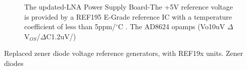 \begin{figure}
 \caption{The updated-LNA Power Supply Board-The +5V reference voltage is provided by a REF195 E-Grade reference IC with a temperature coefficient of less than 5ppm/$^{\circ}$C \cite{ref19x}. The AD8624 opamps (Vo\approximately10uV $\Delta$V$_{OS}$/$\Delta$C\approximately1.2uV/\degc) \cite{ad8624} }
 \label{fig:lnaPSUNew}
\end{figure}







Replaced zener diode voltage reference generators, with REF19x units. Zener diodes 


